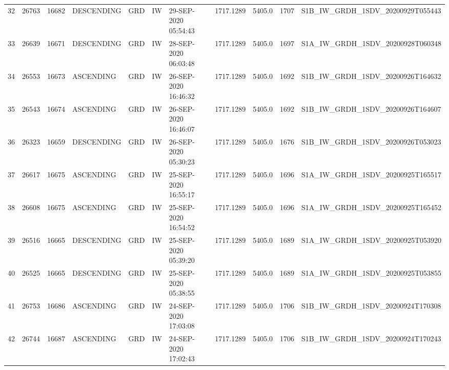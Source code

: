 \begin{tabular}{lrrllllllll}
32  &  26763 &   16682 &  DESCENDING &          GRD &              IW &  29-SEP-2020 05:54:43 &                  1717.1289 &          5405.0 &       1707 &  S1B\_IW\_GRDH\_1SDV\_20200929T055443 \\
33  &  26639 &   16671 &  DESCENDING &          GRD &              IW &  28-SEP-2020 06:03:48 &                  1717.1289 &          5405.0 &       1697 &  S1A\_IW\_GRDH\_1SDV\_20200928T060348 \\
34  &  26553 &   16673 &   ASCENDING &          GRD &              IW &  26-SEP-2020 16:46:32 &                  1717.1289 &          5405.0 &       1692 &  S1B\_IW\_GRDH\_1SDV\_20200926T164632 \\
35  &  26543 &   16674 &   ASCENDING &          GRD &              IW &  26-SEP-2020 16:46:07 &                  1717.1289 &          5405.0 &       1692 &  S1B\_IW\_GRDH\_1SDV\_20200926T164607 \\
36  &  26323 &   16659 &  DESCENDING &          GRD &              IW &  26-SEP-2020 05:30:23 &                  1717.1289 &          5405.0 &       1676 &  S1B\_IW\_GRDH\_1SDV\_20200926T053023 \\
37  &  26617 &   16675 &   ASCENDING &          GRD &              IW &  25-SEP-2020 16:55:17 &                  1717.1289 &          5405.0 &       1696 &  S1A\_IW\_GRDH\_1SDV\_20200925T165517 \\
38  &  26608 &   16675 &   ASCENDING &          GRD &              IW &  25-SEP-2020 16:54:52 &                  1717.1289 &          5405.0 &       1696 &  S1A\_IW\_GRDH\_1SDV\_20200925T165452 \\
39  &  26516 &   16665 &  DESCENDING &          GRD &              IW &  25-SEP-2020 05:39:20 &                  1717.1289 &          5405.0 &       1689 &  S1A\_IW\_GRDH\_1SDV\_20200925T053920 \\
40  &  26525 &   16665 &  DESCENDING &          GRD &              IW &  25-SEP-2020 05:38:55 &                  1717.1289 &          5405.0 &       1689 &  S1A\_IW\_GRDH\_1SDV\_20200925T053855 \\
41  &  26753 &   16686 &   ASCENDING &          GRD &              IW &  24-SEP-2020 17:03:08 &                  1717.1289 &          5405.0 &       1706 &  S1B\_IW\_GRDH\_1SDV\_20200924T170308 \\
42  &  26744 &   16687 &   ASCENDING &          GRD &              IW &  24-SEP-2020 17:02:43 &                  1717.1289 &          5405.0 &       1706 &  S1B\_IW\_GRDH\_1SDV\_20200924T170243 \\

\end{tabular}
